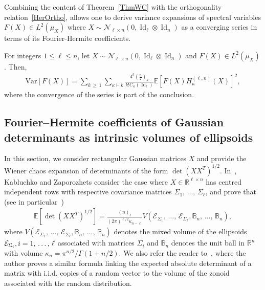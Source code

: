 \documentclass[10pt]{amsart}
\theoremstyle{definition}\newtheorem{defi}[theo]{Definition}\newtheorem{rema}[theo]{Remark}\newtheorem{exam}[theo]{Example}\newtheorem{exem}[theo]{Example}\newtheorem{nota}[theo]{Notation}
\DeclareMathOperator{\Id}{Id}
\newcommand{\scN}{\mathscr{N}}
\newcommand{\clE}{\mathcal{E}}
\newcommand{\R}{\mathbb{R}}
\newcommand{\bbB}{\mathbb{B}}
\newcommand{\E}[1]{\mathbb{E}\left[#1\right]}
\newcommand{\V}[1]{\mathrm{Var}{\left[#1\right]}}
\begin{document}
Combining the content of Theorem~\ref{ThmWC} with the orthogonality relation~\eqref{HerOrtho}, allows one to derive variance expansions of spectral variables $F(X)\in L^2(\mu_X)$ where $X \sim \scN_{\ell \times n}(0,\Id_{\ell}\otimes \Id_n)$ as a converging series in terms of its Fourier-Hermite coefficients.

\begin{prop}\label{VarEx}
For integers $1\leq \ell \leq n$, let $X \sim \scN_{\ell \times n}(0,\Id_{\ell}\otimes \Id_n)$ and $F(X) \in L^2(\mu_X)$. Then,
\begin{gather*}
\V{F(X)}=\sum_{k\,\geq\,1}\sum_{\kappa \vdash k}
\frac{4^{k}(\frac{n}{2})_{\kappa}}{k!C_{\kappa}(\Id_{\ell}) }
\E{F(X) H_{\kappa}^{(\ell,n)}(X)}^2,
\end{gather*}
where the convergence of the series is part of the conclusion.
\end{prop}



\subsection{Fourier--Hermite coefficients of Gaussian determinants as intrinsic volumes of ellipsoids}\label{SectGeom}
In this section, we consider rectangular Gaussian matrices $X$ and provide the Wiener chaos expansion of determinants of the form $\det(XX^T)^{1/2}$. In~\cite{Kab14}, Kablu\-chko and Zaporozhets consider the case where $X\in \R^{\ell\times n}$ has centred independent rows with respective covariance matrices $\Sigma_1,\,\ldots,\,\Sigma_{\ell}$, and prove that (see in particular~\cite[Theorem~1.1]{Kab14})
\begin{gather}\label{Kab11}
\E{\det\left(XX^T\right)^{1/2}} = \frac{(n)_{\ell}}{(2\pi)^{\ell/2}\kappa_{n-\ell}}V\left(\clE_{\Sigma_1},\,\ldots,\,\clE_{\Sigma_{\ell}},\bbB_n,\,\ldots,\,\bbB_n\right),
\end{gather}
where $V(\clE_{\Sigma_1},\,\ldots,\,\clE_{\Sigma_{\ell}},\bbB_n,\,\ldots,\,\bbB_n)$ denotes the mixed volume of the ellipsoids $\clE_{\Sigma_i}, i\linebreak =1,\,\ldots,\,\ell$ associated with matrices $\Sigma_i$ and $\bbB_n$ denotes the unit ball in $\R^n$ with volume $\kappa_n= \pi^{n/2}/\Gamma(1+n/2)$. We also refer the reader to~\cite[Theorem~3.2]{Vit:91}, where the author proves a similar formula linking the expected absolute determinant of a matrix with i.i.d. copies of a random vector to the volume of the zonoid associated with the random distribution.
\end{document}
